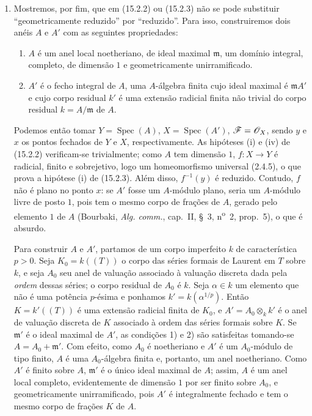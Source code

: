 \begin{remarks}[15.2.4]
\begin{enumerate}[label=(\roman*)]
  \item Mostremos, por fim, que em (15.2.2) ou (15.2.3) não se pode substituir “geometricamente reduzido” por “reduzido”. Para isso, construiremos dois anéis $A$ e $A'$ com as seguintes propriedades:
  \begin{enumerate}[label=\arabic*)]
    \item $A$ é um anel local noetheriano, de ideal maximal $\mathfrak m$, um domínio integral, completo, de dimensão $1$ e geometricamente unirramificado.
    \item $A'$ é o fecho integral de $A$, uma $A$-álgebra finita cujo ideal maximal é $\mathfrak mA'$ e cujo corpo residual $k'$ é uma extensão radicial finita não trivial do corpo residual $k=A/\mathfrak m$ de $A$.
  \end{enumerate}
  Podemos então tomar $Y=\operatorname{Spec}(A)$, $X=\operatorname{Spec}(A')$, $\mathscr{F}=\mathscr{O}_X$, sendo $y$ e $x$ os pontos fechados de $Y$ e $X$, respectivamente. As hipóteses (i) e (iv) de (15.2.2) verificam-se trivialmente; como $A$ tem dimensão $1$, $f:X\to Y$ é radicial, finito e sobrejetivo, logo um homeomorfismo universal (2.4.5), o que prova a hipótese (i) de (15.2.3). Além disso, $f^{-1}(y)$ é reduzido. Contudo, $f$ não é plano no ponto $x$: se $A'$ fosse um $A$-módulo plano, seria um $A$-módulo livre de posto $1$, pois tem o mesmo corpo de frações de $A$, gerado pelo elemento $1$ de $A$ (Bourbaki, \emph{Alg. comm.}, cap.~II, \S~3, n\textsuperscript{o}~2, prop.~5), o que é absurdo.

  Para construir $A$ e $A'$, partamos de um corpo imperfeito $k$ de característica $p>0$. Seja $K_0=k((T))$ o corpo das séries formais de Laurent em $T$ sobre $k$, e seja $A_0$ seu anel de valuação associado à valuação discreta dada pela \emph{ordem} dessas séries; o corpo residual de $A_0$ é $k$. Seja $\alpha\in k$ um elemento que não é uma potência $p$-ésima e ponhamos $k'=k(\alpha^{1/p})$. Então $K=k'((T))$ é uma extensão radicial finita de $K_0$, e $A'=A_0\otimes_k k'$ é o anel de valuação discreta de $K$ associado à ordem das séries formais sobre $K$. Se $\mathfrak m'$ é o ideal maximal de $A'$, as condições 1) e 2) são satisfeitas tomando-se $A=A_0+\mathfrak m'$. Com efeito, como $A_0$ é noetheriano e $A'$ é um $A_0$-módulo de tipo finito, $A$ é uma $A_0$-álgebra finita e, portanto, um anel noetheriano. Como $A'$ é finito sobre $A$, $\mathfrak m'$ é o único ideal maximal de $A$; assim, $A$ é um anel local completo, evidentemente de dimensão $1$ por ser finito sobre $A_0$, e geometricamente unirramificado, pois $A'$ é integralmente fechado e tem o mesmo corpo de frações $K$ de $A$.


\end{enumerate}
\end{remarks}
